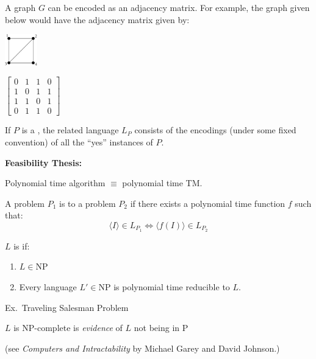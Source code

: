\begin{frame}
A graph $G$ can be encoded as an adjacency matrix.  For example, the
graph given below would have the adjacency matrix given by:

\begin{center}
\begin{minipage}{2cm}
\includegraphics[width=1.4cm]{Figures/14.pdf}
\end{minipage}
\begin{minipage}{3cm}
{\footnotesize $\left[\begin{array}{cccc}
0 & 1 & 1 & 0 \\
1 & 0 & 1 & 1 \\
1 & 1 & 0 & 1 \\
0 & 1 & 1 & 0
\end{array}\right]$}
\end{minipage}
\end{center}

If $P$ is a , the related language $L_P$
consists of the encodings (under some fixed convention) of all the
``yes'' instances of $P$.

{\bf Feasibility Thesis:}
\begin{center}
Polynomial time algorithm $\equiv$ polynomial time TM.
\end{center}
\end{frame}

\begin{frame}
A problem $P_1$ is  to a
problem $P_2$ if there exists a polynomial time function $f$ such
that:
$$
\langle I\rangle\in L_{P_1}\iff
\langle f(I)\rangle\in L_{P_2}
$$

$L$ is  if:
\begin{enumerate}
\item  $L\in\text{NP}$
\item  Every language $L'\in\text{NP}$ is polynomial time reducible
to $L$.
\end{enumerate}

Ex.\ Traveling Salesman Problem

$L$ is NP-complete is {\em evidence}
of $L$ not being in P

(see {\em Computers and Intractability} by Michael Garey and David
Johnson.)
\end{frame}


